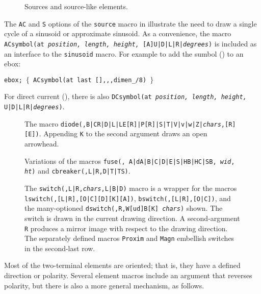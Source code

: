 \begin{figure}[ht]
   
   \caption{Sources and source-like elements.}
   \label{Sources}
   \end{figure}

The {\tt AC} and {\tt S} options of the {\tt source} macro in 
illustrate the need
to draw a single cycle of a sinusoid or approximate sinusoid.
As a convenience,
the macro {\tt ACsymbol(at {\sl position, length, height,}
  [A]U|D|L|R|{\sl degrees})} is included as an interface to
the {\tt sinusoid} macro.  For example to add the sumbol
() to an ebox:
\par
{\tt ebox; $\lbrace$\ ACsymbol(at last [],{,},dimen\_/8) $\rbrace$}

\noindent
For direct current (), there is also
{\tt DCsymbol(at {\sl position, length, height,} U|D|L|R|{\sl degrees})}.

\begin{figure}[ht]
   
   \caption{The macro
     {\tt diode(\linespec,B|CR|D|L|LE[R]|P[R]|S|T|V|v|w|Z|{\sl chars},[R][E])}.
      Appending {\tt K} to the second argument draws an open arrowhead.}
   \label{Diodes}
   \end{figure}

\begin{figure}[t!]
   
   \caption{Variations of the macros
     {\tt fuse(\linespec, A|dA|B|C|D|E|S|HB|HC|SB, {\sl wid}, {\sl ht})}
     and {\tt cbreaker(\linespec,L|R,D|T|TS)}.}
   \label{Fuses}
   \end{figure}
\begin{figure}[t!]
   
   \caption{The
     {\tt switch(\linespec,L|R,{\sl chars},L|B|D)}
     macro is a wrapper for the macros 
     {\tt lswitch(\linespec,[L|R],[O|C][D][K][A])},
     {\tt bswitch(\linespec,[L|R],[O|C])},
     and the many-optioned
     {\tt dswitch(\linespec,R,W[ud]B[K] {\sl chars})} shown.
     The switch is drawn in the current drawing direction.
     A second-argument {\tt R} produces a mirror
     image with respect to the drawing direction.
     The separately defined macros {\tt Proxim} and {\tt Magn}
     embellish switches in the second-last row.}
   \label{Switches}
   \end{figure}

Most of the two-terminal elements are oriented; that is, they have
a defined direction or polarity.  Several element macros include an
argument that reverses polarity, but there is also a more general
mechanism, as follows.

